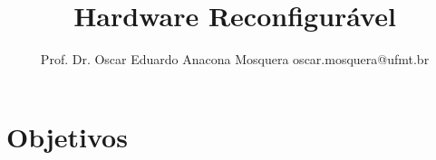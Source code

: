 \documentclass[aspectratio=169]{beamer}
\title[Minicurso FPGAs]{\huge Hardware Reconfigurável} %
\author[Prof. Dr. Oscar Eduardo Anacona Mosquera]{Prof. Dr. Oscar Eduardo Anacona Mosquera \newline\newline 
\scriptsize{oscar.mosquera@ufmt.br}
}%
\begin{document}
\begin{frame}[plain]
\titlepage

\end{frame}



\section{Objetivos}
\end{document}

